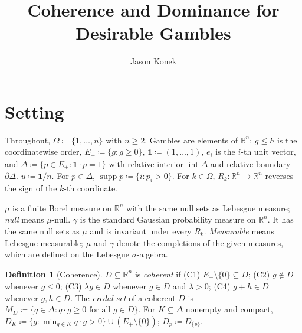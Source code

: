 \documentclass[11pt]{article}
\title{Coherence and Dominance for Desirable Gambles}
\author{Jason Konek}
\date{}
\newcommand{\chg}[1]{{\color{red}#1}}
\theoremstyle{definition}
\newtheorem{definition}[theorem]{Definition}
\theoremstyle{remark}
\newcommand{\one}{\mathbf 1}
\newcommand{\R}{\mathbb R}
\newcommand{\interior}{\operatorname{int}}
\newcommand{\bd}{\partial}
\newcommand{\supp}{\operatorname{supp}}
\begin{document}
\maketitle


\section{Setting}\label{sec:setting}

Throughout, $\Omega\coloneqq\{1,\dots,n\}$ with $n\ge2$. Gambles are elements of $\R^n$; $g\le h$ is the coordinatewise order, $E_+\coloneqq\{g:g\ge0\}$, $\one\coloneqq(1,\dots,1)$, $e_i$ is the $i$-th unit vector, and $\Delta\coloneqq\{p\in E_+:\one\cdot p=1\}$ with relative interior $\interior\Delta$ and relative boundary $\bd\Delta$. $u\coloneqq\one/n$. For $p\in\Delta$, $\supp p\coloneqq\{i:p_i>0\}$. For $k\in\Omega$, $R_k:\R^n\to\R^n$ reverses the sign of the $k$-th coordinate.

$\mu$ is a finite Borel measure on $\R^n$ with the same null sets as Lebesgue measure; \emph{null} means $\mu$-null. $\gamma$ is the standard Gaussian probability measure on $\R^n$. It has the same null sets as $\mu$ and is invariant under every $R_k$. \chg{\emph{Measurable} means Lebesgue measurable; $\mu$ and $\gamma$ denote the completions of the given measures, which are defined on the Lebesgue $\sigma$-algebra.}

\begin{definition}[Coherence]\label{def:coherence}
$D\subseteq\R^n$ is \emph{coherent} if (C1) $E_+\setminus\{0\}\subseteq D$; (C2) $g\notin D$ whenever $g\le0$; (C3) $\lambda g\in D$ whenever $g\in D$ and $\lambda>0$; (C4) $g+h\in D$ whenever $g,h\in D$. The \emph{credal set} of a coherent $D$ is $M_D\coloneqq\{q\in\Delta:q\cdot g\ge0\text{ for all }g\in D\}$. For $K\subseteq\Delta$ nonempty and compact, $D_K\coloneqq\{g:\min_{q\in K}q\cdot g>0\}\cup(E_+\setminus\{0\})$; $D_p\coloneqq D_{\{p\}}$.
\end{definition}
\end{document}
